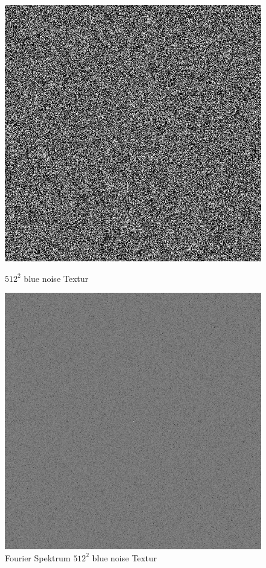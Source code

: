 \cite{WhiteNoiseGenerator}
\begin{figure}[H]\label{pic:whitenoiseFFT}
    \centering
    \begin{minipage}[t]{0.45\linewidth}
        \centering
        \includegraphics[width=\linewidth]{content/BlueNoise/Bilder/whitenoise.png}
        \caption{$512^{2}$ blue noise Textur}
    \end{minipage}
    \hfill
    \begin{minipage}[t]{0.45\linewidth}
        \centering
        \includegraphics[width=\linewidth]{content/BlueNoise/Bilder/FFT_whitenoise.png}
        \caption{Fourier Spektrum $512^{2}$ blue noise Textur}
    \end{minipage}
\end{figure}
\cite{kiencke2009signale}

